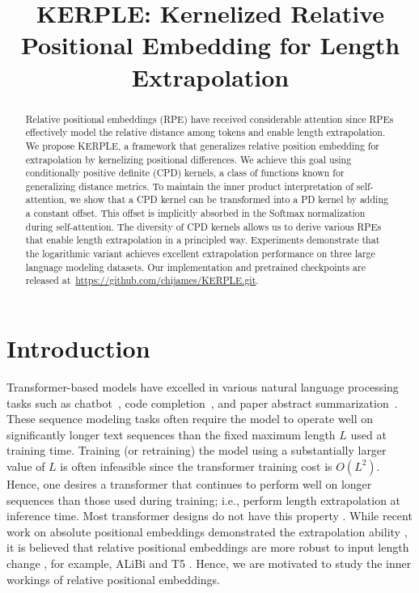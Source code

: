 \title{KERPLE: Kernelized Relative Positional Embedding for Length Extrapolation}



\begin{NoHyper}
\def\thefootnote{$^*$}
\end{NoHyper}

\maketitle

\begin{abstract}
Relative positional embeddings (RPE) have received considerable attention since RPEs effectively model the relative distance among tokens and enable length extrapolation. We propose KERPLE, a framework that generalizes relative position embedding for extrapolation by kernelizing positional differences. We achieve this goal using conditionally positive definite (CPD) kernels, a class of functions known for generalizing distance metrics. To maintain the inner product interpretation of self-attention, we show that a CPD kernel can be transformed into a PD kernel by adding a constant offset. This offset is implicitly absorbed in the Softmax normalization during self-attention. The diversity of CPD kernels allows us to derive various RPEs that enable length extrapolation in a principled way. Experiments demonstrate that the logarithmic variant achieves excellent extrapolation performance on three large language modeling datasets. Our implementation and pretrained checkpoints are released at~\url{https://github.com/chijames/KERPLE.git}.
\end{abstract}

\section{Introduction}
Transformer-based models have excelled in various natural language processing tasks such as chatbot~\citep{roller2021recipes}, code completion~\citep{chen2021codex}, and paper abstract summarization~\citep{zhang2020pegasus}.
These sequence modeling tasks often require the model to operate well on significantly longer text sequences than the fixed maximum length $L$ used at training time. Training (or retraining) the model using a substantially larger value of $L$ is often infeasible since the transformer training cost is $O(L^2)$. Hence, one desires a transformer that continues to perform well on longer sequences than those used during training; i.e., perform length extrapolation at inference time. Most transformer designs do not have this property \citep{press2022train}. While recent work on absolute positional embeddings demonstrated the extrapolation ability \citep{kiyono2021shiftedAbs,Likhomanenko2021CAPE}, it is believed that relative positional embeddings are more robust to input length change \citep{Likhomanenko2021CAPE}, for example, ALiBi \citep{press2022train} and T5 \citep{raffel2019exploring}. Hence, we are motivated to study the inner workings of relative positional embeddings.


